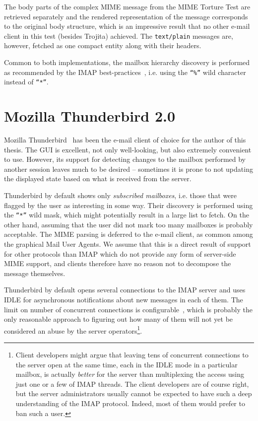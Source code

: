 \documentclass[12pt,notitlepage]{report}
\newcommand{\trojita}{Trojita\xspace}
\begin{document}
The body parts of the complex MIME message from the MIME Torture Test are
retrieved separately and the rendered representation of the message corresponds
to the original body structure, which is an impressive result that no other
e-mail client in this test (besides \trojita) achieved.  The {\tt text/plain}
messages are, however, fetched as one compact entity along with their headers.

Common to both implementations, the mailbox hierarchy discovery is performed as
recommended by the IMAP best-practices~\cite{client-best-practices}, i.e. using
the {\tt ``\%''} wild character instead of {\tt ``*''}.

\section{Mozilla Thunderbird 2.0}

Mozilla Thunderbird~\cite{thunderbird} has been the e-mail client of choice for
the author of this thesis.  The GUI is excellent, not only well-looking, but
also extremely convenient to use.  However, its support for detecting changes to
the mailbox performed by another session leaves much to be desired -- sometimes
it is prone to not updating the displayed state based on what is received from
the server.

Thunderbird by default shows only {\em subscribed mailboxes}, i.e. those that
were flagged by the user as interesting in some way.  Their discovery is
performed using the {\tt ``*''} wild mask, which might potentially result in a
large list to fetch.  On the other hand, assuming that the user did not mark
too many mailboxes is probably acceptable.  The MIME parsing is deferred to the
e-mail client, as common among the graphical Mail User Agents.  We assume that
this is a direct result of support for other protocols than IMAP which do not
provide any form of server-side MIME support, and clients therefore have no
reason not to decompose the message themselves.

Thunderbird by default opens several connections to the IMAP server and uses
IDLE for asynchronous notifications about new messages in each of them.  The
limit on number of concurrent connections is configurable~\cite{mozilla-imap},
which is probably the only reasonable approach to figuring out how many of them
will not yet be considered an abuse by the server operators\footnote{Client
developers might argue that leaving tens of concurrent connections to the server
open at the same time, each in the IDLE mode in a particular mailbox, is
actually {\em better} for the server than multiplexing the access using just one
or a few of IMAP threads.  The client developers are of course right, but the
server administrators usually cannot be expected to have such a deep
understanding of the IMAP protocol.  Indeed, most of them would prefer to ban
such a user.}.
\end{document}
